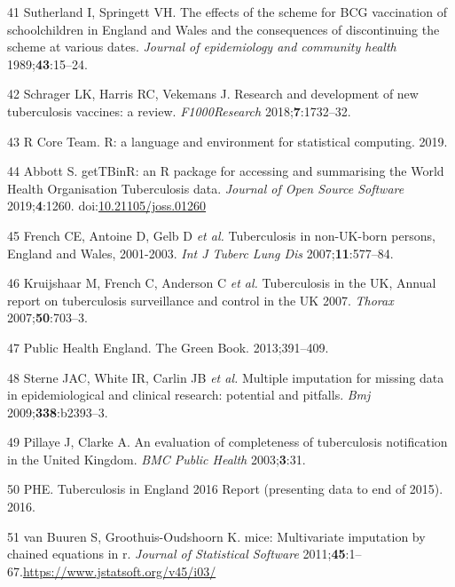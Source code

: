 \documentclass[11pt,twoside]{bristolthesis}
\begin{document}
  \leavevmode\hypertarget{ref-Sutherland1989}{}%
  41 Sutherland I, Springett VH. The effects of the scheme for BCG vaccination of schoolchildren in England and Wales and the consequences of discontinuing the scheme at various dates. \emph{Journal of epidemiology and community health} 1989;\textbf{43}:15--24.
  
  \leavevmode\hypertarget{ref-Schrager:2018ip}{}%
  42 Schrager LK, Harris RC, Vekemans J. Research and development of new tuberculosis vaccines: a review. \emph{F1000Research} 2018;\textbf{7}:1732--32.
  
  \leavevmode\hypertarget{ref-RCoreTeam2019}{}%
  43 R Core Team. R: a language and environment for statistical computing. 2019.
  
  \leavevmode\hypertarget{ref-Abbott:2018}{}%
  44 Abbott S. getTBinR: an R package for accessing and summarising the World Health Organisation Tuberculosis data. \emph{Journal of Open Source Software} 2019;\textbf{4}:1260. doi:\href{https://doi.org/10.21105/joss.01260}{10.21105/joss.01260}
  
  \leavevmode\hypertarget{ref-French2007}{}%
  45 French CE, Antoine D, Gelb D \emph{et al.} Tuberculosis in non-UK-born persons, England and Wales, 2001-2003. \emph{Int J Tuberc Lung Dis} 2007;\textbf{11}:577--84.
  
  \leavevmode\hypertarget{ref-Kriujshaar2007}{}%
  46 Kruijshaar M, French C, Anderson C \emph{et al.} Tuberculosis in the UK, Annual report on tuberculosis surveillance and control in the UK 2007. \emph{Thorax} 2007;\textbf{50}:703--3.
  
  \leavevmode\hypertarget{ref-PublicHealthEngland2011a}{}%
  47 Public Health England. The Green Book. 2013;391--409.
  
  \leavevmode\hypertarget{ref-Sterne2009a}{}%
  48 Sterne JAC, White IR, Carlin JB \emph{et al.} Multiple imputation for missing data in epidemiological and clinical research: potential and pitfalls. \emph{Bmj} 2009;\textbf{338}:b2393--3.
  
  \leavevmode\hypertarget{ref-Pillaye2003}{}%
  49 Pillaye J, Clarke A. An evaluation of completeness of tuberculosis notification in the United Kingdom. \emph{BMC Public Health} 2003;\textbf{3}:31.
  
  \leavevmode\hypertarget{ref-PHE2016}{}%
  50 PHE. Tuberculosis in England 2016 Report (presenting data to end of 2015). 2016.
  
  \leavevmode\hypertarget{ref-Groothuis-oudshoorn}{}%
  51 van Buuren S, Groothuis-Oudshoorn K. mice: Multivariate imputation by chained equations in r. \emph{Journal of Statistical Software} 2011;\textbf{45}:1--67.\url{https://www.jstatsoft.org/v45/i03/}
  
\end{document}
